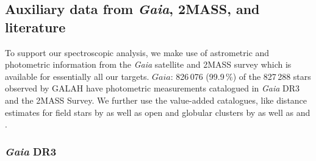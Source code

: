 \documentclass[
  journal=pasa,
  manuscript=research-paper, %
  year=2023,
  volume=37
]{cup-journal}
\newcommand{\Gaia}{\textit{Gaia}\xspace}
\begin{document}

\subsection{Auxiliary data from \Gaia, 2MASS, and literature} \label{sec:non-spec_data}


To support our spectroscopic analysis, we make use of astrometric and photometric information from the \Gaia satellite \citep{Gaia-Collaboration2016} and 2MASS survey \citep{Skrutskie2006} which is available for essentially all our targets. $Gaia$: 826\,076 (99.9\,\%) of the 827\,288 stars observed by GALAH have photometric measurements catalogued in \Gaia DR3 and the 2MASS Survey. We further use the value-added catalogues, like distance estimates for field stars by \citep{BailerJones2021} as well as open and globular clusters by \citet{CantatGaudin2020} as well as \citet{Vasiliev2021} and \citet{Baumgardt2021}.

\subsubsection{\Gaia DR3}
\end{document}
